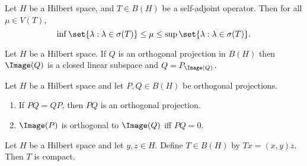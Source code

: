 \documentclass[12pt,letterpaper,twoside]{hmcpset}
\begin{document}
\begin{problem}[3]
  Let $H$ be a Hilbert space, and $T \in B(H)$ be a self-adjoint operator.  Then for all $\mu \in V(T)$,
  \[
  \inf \set{\lambda : \lambda \in \sigma(T)} \leq \mu \leq \sup\set{\lambda : \lambda \in \sigma(T)}.
  \]

\end{problem}

\begin{solution}

\end{solution}

\begin{problem}[4]
  Let $H$ be a Hilbert space.  If $Q$ is an orthogonal projection in $B(H)$ then $\Image(Q)$ is a closed linear subspace and $Q = P_{\Image(Q)}$.
\end{problem}

\begin{solution}
  
\end{solution}

\begin{problem}[5]
  Let $H$ be a Hilbert space and let $P,Q \in B(H)$ be orthogonal projections.
  \begin{enumerate}[label=(\alph*)]
  \item If $PQ = QP$, then $PQ$ is an orthogonal projection.
  \item $\Image(P)$ is orthogonal to $\Image(Q)$ iff $PQ = 0$.
  \end{enumerate}
\end{problem}

\begin{solution}
  
\end{solution}

\begin{problem}[6]
  Let $H$ be a Hilbert space and let $y,z \in H$.  Define $T \in B(H)$ by $Tx = (x,y)z$. Then $T$ is compact.
\end{problem}

\begin{solution}
  
\end{solution}
\end{document}
